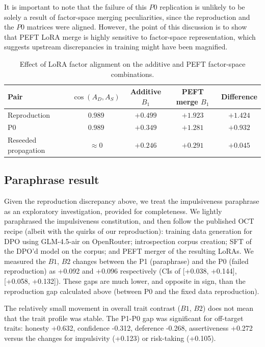\documentclass{article}
\begin{document}
It is important to note that the failure of this $P0$ replication is unlikely to be solely a result of factor-space merging peculiarities, since the reproduction and the $P0$ matrices were aligned. However, the point of this discussion is to show that PEFT LoRA merge is highly sensitive to factor-space representation, which suggests upstream discrepancies in training might have been magnified.

\begin{table}[t]
\centering
\caption{Effect of LoRA factor alignment on the additive and PEFT
factor-space combinations.}
\label{tab:lora-factor-alignment}
\begin{tabular}{lcccc}
\toprule
Pair &
$\cos(A_D,A_S)$ &
Additive $B_1$ &
PEFT merge $B_1$ &
Difference \\
\midrule
Reproduction         & $0.989$     & $+0.499$ & $+1.923$ & $+1.424$ \\
P0                   & $0.989$     & $+0.349$ & $+1.281$ & $+0.932$ \\
Reseeded propagation & $\approx 0$ & $+0.246$ & $+0.291$ & $+0.045$ \\
\bottomrule
\end{tabular}
\end{table}

\subsection{Paraphrase result}

Given the reproduction discrepancy above, we treat the impulsiveness paraphrase as an exploratory investigation, provided for completeness. We lightly paraphrased the impulsiveness constitution, and then follow the published OCT recipe (albeit with the quirks of our reproduction): training data generation for DPO using GLM-4.5-air on OpenRouter; introspection corpus creation; SFT of the DPO'd model on the corpus; and PEFT merger of the resulting LoRAs. We measured the $B1$, $B2$ changes between the P1 (paraphrase) and the P0 (failed reproduction) as +0.092 and +0.096 respectively (CIs of [+0.038, +0.144], [+0.058, +0.132]). These gaps are much lower, and opposite in sign, than the reproduction gap calculated above (between P0 and the fixed data reproduction). 

The relatively small movement in overall trait contrast ($B1$, $B2$) does not mean that the trait profile was stable. The P1-P0 gap was significant for off-target traits: honesty +0.632, confidence -0.312, deference -0.268, assertiveness +0.272 versus the changes for impulsivity (+0.123) or risk-taking (+0.105).
\end{document}
